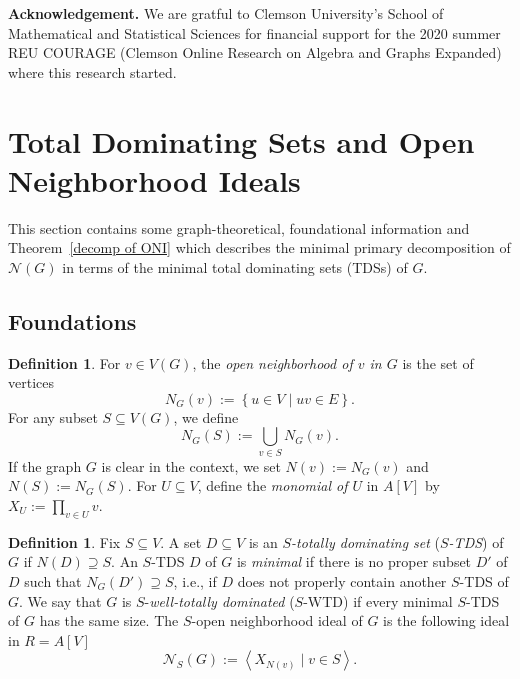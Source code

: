 \documentclass[12pt, reqno]{amsart}
\theoremstyle{definition}
\theoremstyle{plain}
\theoremstyle{definition}
\newtheorem{example}[theorem]{Example}
\newtheorem{definition}[theorem]{Definition}
\newcommand\gen[1]{\left\langle #1 \right\rangle}
\newcommand\Set[2]{\left\lbrace #1 \mid #2 \right\rbrace}
\newcommand\set[1]{\left\lbrace #1 \right\rbrace}
\newcommand{\NN}{\mathcal{N}}
\begin{document}
\noindent\textbf{Acknowledgement.} We are gratful to Clemson University's School of Mathematical and Statistical Sciences for financial support for the 2020 summer REU COURAGE (Clemson Online Research on Algebra and Graphs Expanded) where this research started.

\section{Total Dominating Sets and Open Neighborhood Ideals}
\label{subsec241204a}

This section contains some graph-theoretical, foundational information and Theorem~\ref{decomp of ONI} which describes the minimal primary decomposition of $\NN(G)$ in terms of the minimal total dominating sets (TDSs) of $G$.

\subsection{Foundations}\label{subsec. foundations}

\begin{definition}\label{def. open neighborhood}
    For $v \in V(G)$, the \emph{open neighborhood of $v$ in $G$} is the set of vertices 
$$
N_G(v) := \Set{u \in V}{uv \in E}.
$$
For any subset $S \subseteq V(G)$, we define 
$$
N_G(S) := \bigcup_{v \in S} N_G(v).
$$
If the graph $G$ is clear in the context, we set $N(v):=N_G(v)$ and $N(S):=N_G(S)$.
    For $U \subseteq V$, define the \emph{monomial of $U$} in $A[V]$ by  
    $X_U := \prod_{v \in U} v$.
\end{definition}

%    

\begin{definition}\label{def. S-TDS, SONI}
Fix $S \subseteq V$.
A set $D \subseteq V$ is an \emph{$S$-totally dominating set} (\emph{$S$-TDS}) of $G$ if $N(D) \supseteq S$. An $S$-TDS $D$ of $G$
is \emph{minimal} if there is no proper subset $D'$ of $D$ such that $N_G(D') \supseteq S$, i.e., if $D$ does not properly contain another $S$-TDS of $G$.
We say that $G$ is $S$-\emph{well-totally dominated} ($S$-WTD) if every minimal $S$-TDS of $G$ has the same size.
The $S$-open neighborhood ideal of $G$ is the following ideal in $R = A[V]$
    $$
    \NN_S(G) := \gen{X_{N(v)}\mid v \in S}.
    $$
\end{definition}
\end{document}
